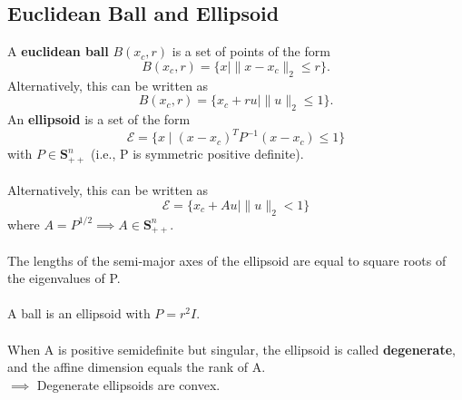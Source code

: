 \documentclass[]{article}
\begin{document}
\subsection*{Euclidean Ball and Ellipsoid}
A \textbf{euclidean ball} $B(x_{c}, r)$ is a set of points of the form $$B(x_{c}, r) = \{x \mid \| x - x_{c} \|_{2} \leq r\}.$$
Alternatively, this can be written as $$B(x_{c}, r) = \{x_{c} + ru \mid \| u \|_{2} \leq 1\}.$$
An \textbf{ellipsoid} is a set of the form $$ \mathcal{E} =  \{ x \mid (x - x_c)^{T} P^{-1} (x - x_{c}) \leq 1 \}$$
with $P \in \boldsymbol{S}^{n}_{++}$ (i.e., P is symmetric positive definite). \\\\
Alternatively, this can be written as $$ \mathcal{E} = \{x_{c} + Au \mid \| u \|_{2} < 1 \}$$
where $A=P^{1/2} \implies A \in \boldsymbol{S}^{n}_{++}.$ \\\\ 
The lengths of the semi-major axes of the ellipsoid are equal to square roots of the eigenvalues of P. \\\\
A ball is an ellipsoid with $P=r^{2}I.$
\\\\
When A is positive semidefinite but singular, the ellipsoid is called \textbf{degenerate}, and the affine dimension equals the rank of A.
\\
$\implies$ Degenerate ellipsoids are convex. \\ 
\end{document}
